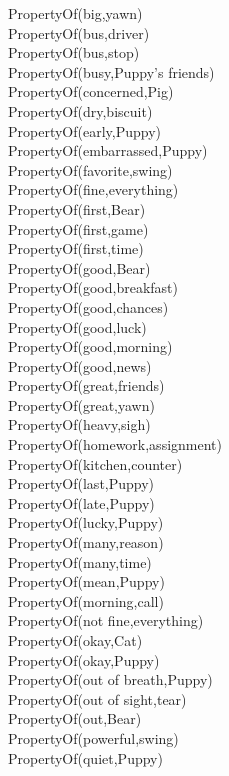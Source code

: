 \begin{multicols}{2}
\begin{footnotesize}
PropertyOf(big,yawn) \\
PropertyOf(bus,driver) \\
PropertyOf(bus,stop) \\
PropertyOf(busy,Puppy's friends) \\
PropertyOf(concerned,Pig) \\
PropertyOf(dry,biscuit) \\
PropertyOf(early,Puppy) \\
PropertyOf(embarrassed,Puppy) \\
PropertyOf(favorite,swing) \\
PropertyOf(fine,everything) \\
PropertyOf(first,Bear) \\
PropertyOf(first,game) \\
PropertyOf(first,time) \\
PropertyOf(good,Bear) \\
PropertyOf(good,breakfast) \\
PropertyOf(good,chances) \\
PropertyOf(good,luck) \\
PropertyOf(good,morning) \\
PropertyOf(good,news) \\
PropertyOf(great,friends) \\
PropertyOf(great,yawn) \\
PropertyOf(heavy,sigh) \\
PropertyOf(homework,assignment) \\
PropertyOf(kitchen,counter) \\
PropertyOf(last,Puppy) \\
PropertyOf(late,Puppy) \\
PropertyOf(lucky,Puppy) \\
PropertyOf(many,reason) \\
PropertyOf(many,time) \\
PropertyOf(mean,Puppy) \\
PropertyOf(morning,call) \\
PropertyOf(not fine,everything) \\
PropertyOf(okay,Cat) \\
PropertyOf(okay,Puppy) \\
PropertyOf(out of breath,Puppy) \\
PropertyOf(out of sight,tear) \\
PropertyOf(out,Bear) \\
PropertyOf(powerful,swing) \\
PropertyOf(quiet,Puppy) \\

\end{footnotesize}
\end{multicols}
